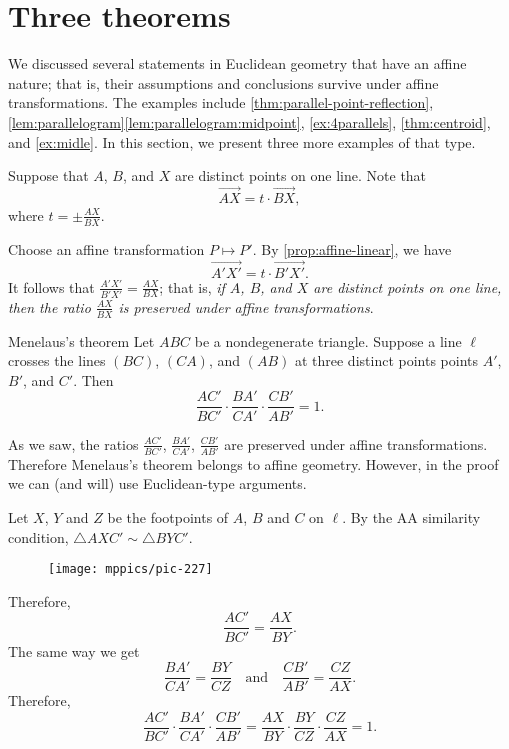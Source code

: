 \section{Three theorems}

We discussed several statements in Euclidean geometry that have an affine nature;
that is, their assumptions and conclusions survive under affine transformations.
The examples include 
\ref{thm:parallel-point-reflection},
\ref{lem:parallelogram}\ref{lem:parallelogram:midpoint},
\ref{ex:4parallels},
\ref{thm:centroid},
and \ref{ex:midle}.
In this section, we present three more examples of that type.

Suppose that $A$, $B$, and $X$ are distinct points on one line.
Note that 
\[\overrightarrow{AX}=t\cdot \overrightarrow{BX},\]
where $t=\pm\frac{AX}{BX}$.

Choose an affine transformation $P\mapsto P'$.
By \ref{prop:affine-linear}, we have 
\[\overrightarrow{A'X'}=t\cdot \overrightarrow{B'X'}.\]
It follows that $\frac{A'X'}{B'X'}=\frac{AX}{BX}$;
that is, \textit{if $A$, $B$, and $X$ are distinct points on one line, then the ratio $\frac{AX}{BX}$ is preserved under affine transformations}.

\begin{thm}{Menelaus's theorem}
Let $ABC$ be a nondegenerate triangle.
Suppose a line $\ell$ crosses the lines $(BC)$, $(CA)$, and $(AB)$ at three distinct points points $A'$, $B'$, and $C'$.
Then 
\[\frac{AC'}{BC'}\cdot\frac{BA'}{CA'}\cdot \frac{CB'}{AB'}=1.\]
\end{thm}

As we saw, the ratios $\frac{AC'}{BC'}$, $\frac{BA'}{CA'}$, $\frac{CB'}{AB'}$ are preserved under affine transformations.
Therefore Menelaus's theorem belongs to affine geometry.
However, in the proof we can (and will) use Euclidean-type arguments.

Let $X$, $Y$ and $Z$ be the footpoints of $A$, $B$ and $C$ on $\ell$.
By the AA similarity condition, $\triangle AXC'\sim \triangle BYC'$.
\begin{figure}[!ht]
\centering
\texttt{[image: mppics/pic-227]}
\vskip-10mm
\end{figure}
Therefore, 
\[\frac{AC'}{BC'}=\frac{AX}{BY}.\]
The same way we get
\[\frac{BA'}{CA'}=\frac{BY}{CZ}
\quad\text{and}\quad
\frac{CB'}{AB'}=\frac{CZ}{AX}.\]
Therefore,
\[\frac{AC'}{BC'}\cdot\frac{BA'}{CA'}\cdot \frac{CB'}{AB'}=\frac{AX}{BY}\cdot \frac{BY}{CZ}\cdot \frac{CZ}{AX}=1.\]
\qedsf



